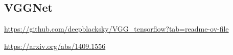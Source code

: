 \subsection{VGGNet}

\url{https://github.com/deepblacksky/VGG_tensorflow?tab=readme-ov-file} 

\url{https://arxiv.org/abs/1409.1556}